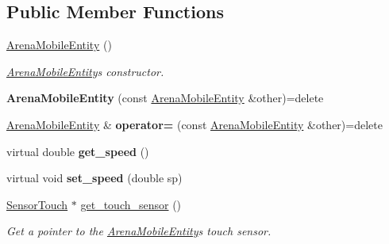 \subsection*{Public Member Functions}
\begin{DoxyCompactItemize}
\item 
\hyperlink{classArenaMobileEntity_a6d038ac71d9b149052fc5a0fec4907f9}{Arena\+Mobile\+Entity} ()\hypertarget{classArenaMobileEntity_a6d038ac71d9b149052fc5a0fec4907f9}{}\label{classArenaMobileEntity_a6d038ac71d9b149052fc5a0fec4907f9}

\begin{DoxyCompactList}\small\item\em \hyperlink{classArenaMobileEntity}{Arena\+Mobile\+Entity}\textquotesingle{}s constructor. \end{DoxyCompactList}\item 
{\bfseries Arena\+Mobile\+Entity} (const \hyperlink{classArenaMobileEntity}{Arena\+Mobile\+Entity} \&other)=delete\hypertarget{classArenaMobileEntity_ad662f3efc1a56b64ecaf5633e7ff2139}{}\label{classArenaMobileEntity_ad662f3efc1a56b64ecaf5633e7ff2139}

\item 
\hyperlink{classArenaMobileEntity}{Arena\+Mobile\+Entity} \& {\bfseries operator=} (const \hyperlink{classArenaMobileEntity}{Arena\+Mobile\+Entity} \&other)=delete\hypertarget{classArenaMobileEntity_a34a7f0d094515cafff7611a0f6cf4eee}{}\label{classArenaMobileEntity_a34a7f0d094515cafff7611a0f6cf4eee}

\item 
virtual double {\bfseries get\+\_\+speed} ()\hypertarget{classArenaMobileEntity_a2116341414a3ad0449dc03efa6ea500b}{}\label{classArenaMobileEntity_a2116341414a3ad0449dc03efa6ea500b}

\item 
virtual void {\bfseries set\+\_\+speed} (double sp)\hypertarget{classArenaMobileEntity_a1a047f4377a9557516a2e1d6d73db849}{}\label{classArenaMobileEntity_a1a047f4377a9557516a2e1d6d73db849}

\item 
\hyperlink{classSensorTouch}{Sensor\+Touch} $\ast$ \hyperlink{classArenaMobileEntity_ae9507f1b0c6bfdfd62afbab8a9a150f7}{get\+\_\+touch\+\_\+sensor} ()\hypertarget{classArenaMobileEntity_ae9507f1b0c6bfdfd62afbab8a9a150f7}{}\label{classArenaMobileEntity_ae9507f1b0c6bfdfd62afbab8a9a150f7}

\begin{DoxyCompactList}\small\item\em Get a pointer to the \hyperlink{classArenaMobileEntity}{Arena\+Mobile\+Entity}\textquotesingle{}s touch sensor. \end{DoxyCompactList}\end{DoxyCompactItemize}
